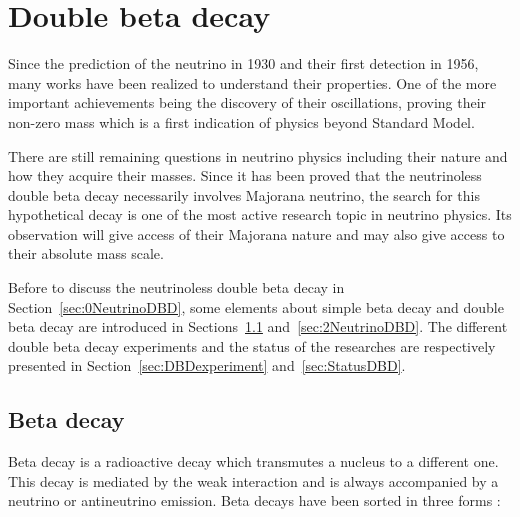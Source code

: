 \documentclass[main.tex]{subfiles}
\begin{document}
\chapter{Double beta decay}
 



\NI Since the prediction of the neutrino in 1930 and their first detection in 1956, many works have been realized to understand their properties. One of the more important achievements being the discovery of their oscillations, proving their non-zero mass which is a first indication of physics beyond Standard Model. 


\bigskip


\NI There are still remaining questions in neutrino physics including their nature and how they acquire their masses. Since it has been proved that the neutrinoless double beta decay necessarily involves Majorana neutrino, the search for this hypothetical decay is one of the most active research topic in neutrino physics. Its observation will give access of their Majorana nature and may also give access to their absolute mass scale.


\bigskip


\NI Before to discuss the neutrinoless double beta decay in Section~\ref{sec:0NeutrinoDBD}, some elements about simple beta decay and double beta decay are introduced in Sections~\ref{sec:betaDecay} and~\ref{sec:2NeutrinoDBD}. The different double beta decay experiments and the status of the researches are respectively presented in Section~\ref{sec:DBDexperiment} and~\ref{sec:StatusDBD}.


\section{Beta decay}\label{sec:betaDecay}


\NI Beta decay is a radioactive decay which transmutes a nucleus to a different one. This decay is mediated by the weak interaction and is always accompanied by a neutrino or antineutrino emission. Beta decays have been sorted in three forms :
\end{document}
